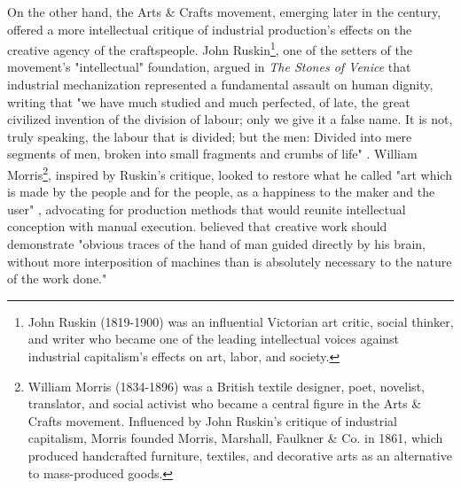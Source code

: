 On the other hand, the Arts \& Crafts movement, emerging later in the century, offered a more intellectual critique of industrial production's effects on the creative agency of the craftspeople. John Ruskin\footnote{John Ruskin (1819-1900) was an influential Victorian art critic, social thinker, and writer who became one of the leading intellectual voices against industrial capitalism's effects on art, labor, and society.}, one of the setters of the movement's "intellectual" foundation, argued in \textit{The Stones of Venice} that industrial mechanization represented a fundamental assault on human dignity, writing that "we have much studied and much perfected, of late, the great civilized invention of the division of labour; only we give it a false name. It is not, truly speaking, the labour that is divided; but the men: Divided into mere segments of men, broken into small fragments and crumbs of life" \citep{ruskin1892}. William Morris\footnote{William Morris (1834-1896) was a British textile designer, poet, novelist, translator, and social activist who became a central figure in the Arts \& Crafts movement. Influenced by John Ruskin's critique of industrial capitalism, Morris founded Morris, Marshall, Faulkner \& Co. in 1861, which produced handcrafted furniture, textiles, and decorative arts as an alternative to mass-produced goods.}, inspired by Ruskin's critique, looked to restore what he called "art which is made by the people and for the people, as a happiness to the maker and the user" \citep{freelibrary2014}, advocating for production methods that would reunite intellectual conception with manual execution. \citet{morris1882} believed that creative work should demonstrate "obvious traces of the hand of man guided directly by his brain, without more interposition of machines than is absolutely necessary to the nature of the work done."

\vspace{0.5cm}

